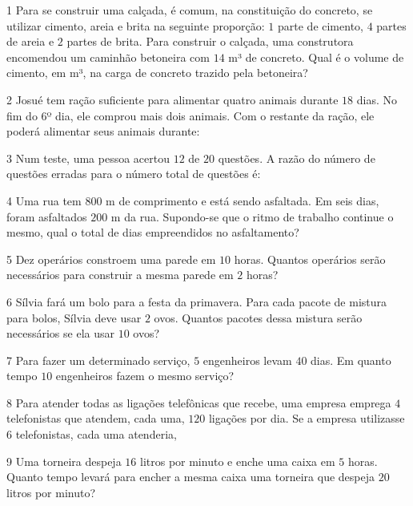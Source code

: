 
\num{1}  Para se construir uma calçada, é comum, na constituição do concreto,
se utilizar cimento, areia e brita na seguinte proporção: $1$ parte de
cimento, $4$ partes de areia e $2$ partes de brita. Para construir o
calçada, uma construtora encomendou um caminhão betoneira com $14$ m³ de
concreto. Qual é o volume de cimento, em m³, na carga de concreto
trazido pela betoneira?


\num{2}  Josué tem ração suficiente para alimentar quatro animais durante $18$
dias. No fim do $6$º dia, ele comprou mais dois animais. Com o restante da
ração, ele poderá alimentar seus animais durante:


\num{3}  Num teste, uma pessoa acertou $12$ de $20$ questões. A razão do número de
questões erradas para o número total de questões é:


\num{4}  Uma rua tem $800$ m de comprimento e está sendo asfaltada. Em seis
dias, foram asfaltados $200$ m da rua. Supondo-se que o ritmo de trabalho
continue o mesmo, qual o total de dias empreendidos no asfaltamento?


\num{5}  Dez operários constroem uma parede em $10$ horas. Quantos operários
serão necessários para construir a mesma parede em $2$ horas?


\num{6}  Sílvia fará um bolo para a festa da primavera. Para cada pacote de
mistura para bolos, Sílvia deve usar $2$ ovos. Quantos pacotes dessa
mistura serão necessários se ela usar $10$ ovos?


\num{7}  Para fazer um determinado serviço, $5$ engenheiros levam $40$ dias. Em
quanto tempo $10$ engenheiros fazem o mesmo serviço?


\num{8}  Para atender todas as ligações telefônicas que recebe, uma empresa
emprega $4$ telefonistas que atendem, cada uma, $120$ ligações por dia. Se a
empresa utilizasse $6$ telefonistas, cada uma atenderia,


\num{9}  Uma torneira despeja $16$ litros por minuto e enche uma caixa em $5$
horas. Quanto tempo levará para encher a mesma caixa uma torneira que
despeja $20$ litros por minuto?

